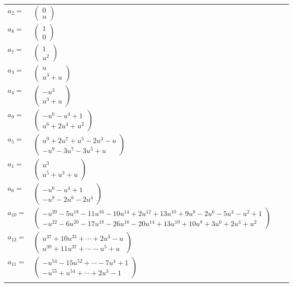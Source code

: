 \documentclass[1p]{elsarticle_modified}
\theoremstyle{definition}
\begin{document}
\begin{tabular}{m{7pt} m{180pt} m{7pt} m{180pt} }
\flushright $a_{2}=$&$\begin{pmatrix}0\\u\end{pmatrix}$ \\
\flushright $a_{8}=$&$\begin{pmatrix}1\\0\end{pmatrix}$ \\
\flushright $a_{7}=$&$\begin{pmatrix}1\\u^2\end{pmatrix}$ \\
\flushright $a_{3}=$&$\begin{pmatrix}u\\u^3+u\end{pmatrix}$ \\
\flushright $a_{4}=$&$\begin{pmatrix}- u^3\\u^3+u\end{pmatrix}$ \\
\flushright $a_{9}=$&$\begin{pmatrix}- u^6- u^4+1\\u^6+2 u^4+u^2\end{pmatrix}$ \\
\flushright $a_{5}=$&$\begin{pmatrix}u^9+2 u^7+u^5-2 u^3- u\\- u^9-3 u^7-3 u^5+u\end{pmatrix}$ \\
\flushright $a_{1}=$&$\begin{pmatrix}u^3\\u^5+u^3+u\end{pmatrix}$ \\
\flushright $a_{6}=$&$\begin{pmatrix}- u^6- u^4+1\\- u^8-2 u^6-2 u^4\end{pmatrix}$ \\
\flushright $a_{10}=$&$\begin{pmatrix}- u^{20}-5 u^{18}-11 u^{16}-10 u^{14}+2 u^{12}+13 u^{10}+9 u^8-2 u^6-5 u^4- u^2+1\\- u^{22}-6 u^{20}-17 u^{18}-26 u^{16}-20 u^{14}+13 u^{10}+10 u^8+3 u^6+2 u^4+u^2\end{pmatrix}$ \\
\flushright $a_{12}=$&$\begin{pmatrix}u^{37}+10 u^{35}+\cdots+2 u^3- u\\u^{39}+11 u^{37}+\cdots- u^5+u\end{pmatrix}$ \\
\flushright $a_{11}=$&$\begin{pmatrix}- u^{54}-15 u^{52}+\cdots-7 u^4+1\\- u^{55}+u^{54}+\cdots+2 u^3-1\end{pmatrix}$\\&\end{tabular}
\end{document}
